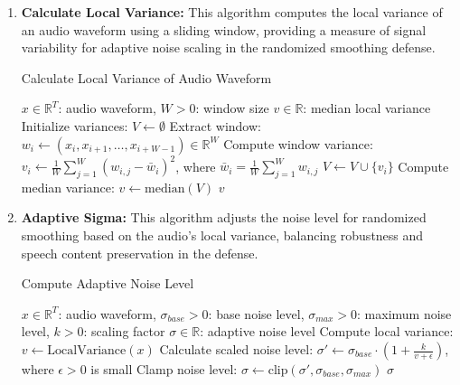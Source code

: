 \documentclass[../main.tex]{subfiles}
\begin{document}
\begin{enumerate}
    \item \textbf{Calculate Local Variance:} This algorithm computes the local variance of an audio waveform using a sliding window, providing a measure of signal variability for adaptive noise scaling in the randomized smoothing defense.

    \begin{breakablealgorithm}{Calculate Local Variance of Audio Waveform}
\begin{algorithmic}[1]
\Require $x \in \mathbb{R}^T$: audio waveform, $W > 0$: window size
\Ensure $v \in \mathbb{R}$: median local variance
\State Initialize variances: $V \gets \emptyset$
    \State Extract window: $w_i \gets (x_i, x_{i+1}, \dots, x_{i+W-1}) \in \mathbb{R}^W$
    \State Compute window variance: $v_i \gets \frac{1}{W} \sum_{j=1}^W (w_{i,j} - \bar{w}_i)^2$, where $\bar{w}_i = \frac{1}{W} \sum_{j=1}^W w_{i,j}$
    \State $V \gets V \cup \{ v_i \}$
\EndFor
\State Compute median variance: $v \gets \text{median}(V)$
\State \Return $v$ 
\end{algorithmic}
\end{breakablealgorithm}

\item \textbf{Adaptive Sigma:} This algorithm adjusts the noise level for randomized smoothing based on the audio’s local variance, balancing robustness and speech content preservation in the defense.
\begin{breakablealgorithm}{Compute Adaptive Noise Level}
\begin{algorithmic}[1]
\Require $x \in \mathbb{R}^T$: audio waveform, $\sigma_{base} > 0$: base noise level, $\sigma_{max} > 0$: maximum noise level, $k > 0$: scaling factor
\Ensure $\sigma \in \mathbb{R}$: adaptive noise level
\State Compute local variance: $v \gets \text{LocalVariance}(x)$ 
\State Calculate scaled noise level: $\sigma' \gets \sigma_{base} \cdot \left(1 + \frac{k}{v + \epsilon}\right)$, where $\epsilon > 0$ is small 
\State Clamp noise level: $\sigma \gets \text{clip}(\sigma', \sigma_{base}, \sigma_{max})$
\State \Return $\sigma$ 
\end{algorithmic}
\end{breakablealgorithm}


\end{enumerate}
\end{document}
